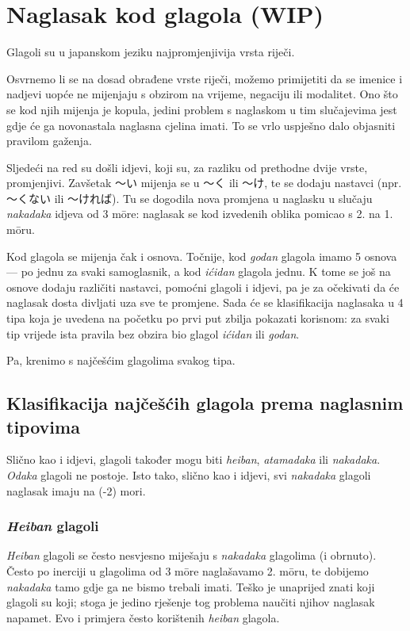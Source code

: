 \documentclass[12pt]{extarticle}
\begin{document}
	\section{Naglasak kod glagola (WIP)}
	\label{sec:glagoli}
	Glagoli su u japanskom jeziku najpromjenjivija vrsta riječi.
	
	Osvrnemo li se na dosad obrađene vrste riječi, možemo primijetiti da se imenice i nadjevi uopće ne mijenjaju s obzirom na vrijeme, negaciju ili modalitet.
	Ono što se kod njih mijenja je kopula, jedini problem s naglaskom u tim slučajevima jest gdje će ga novonastala naglasna cjelina imati.
	To se vrlo uspješno dalo objasniti pravilom gaženja.
	
	Sljedeći na red su došli idjevi, koji su, za razliku od prethodne dvije vrste, promjenjivi.
	Zavšetak 〜い mijenja se u 〜く ili 〜け, te se dodaju nastavci (npr. 〜くない ili 〜ければ).
	Tu se dogodila nova promjena u naglasku u slučaju \textit{nakadaka} idjeva od 3 m\=ore: naglasak se kod izvedenih oblika pomicao s 2. na 1. m\=oru.
	
	Kod glagola se mijenja čak i osnova.
	Točnije, kod \textit{godan} glagola imamo 5 osnova --- po jednu za svaki samoglasnik, a kod \textit{ićidan} glagola jednu.
	K tome se još na osnove dodaju različiti nastavci, pomoćni glagoli i idjevi, pa je za očekivati da će naglasak dosta divljati uza sve te promjene.
	Sada će se klasifikacija naglasaka u 4 tipa koja je uvedena na početku po prvi put zbilja pokazati korisnom: za svaki tip vrijede ista pravila bez obzira bio glagol \textit{ićidan} ili \textit{godan}.
	
	Pa, krenimo s najčešćim glagolima svakog tipa.
	
	\subsection{Klasifikacija najčešćih glagola prema naglasnim tipovima}
	Slično kao i idjevi, glagoli također mogu biti \textit{heiban}, \textit{atamadaka} ili \textit{nakadaka}.
	\textit{Odaka} glagoli ne postoje.
	Isto tako, slično kao i idjevi, svi \textit{nakadaka} glagoli naglasak imaju na (-2) mori.
	
	\subsubsection*{\textit{Heiban} glagoli}
	\textit{Heiban} glagoli se često nesvjesno miješaju s \textit{nakadaka} glagolima (i obrnuto).
	Često po inerciji u glagolima od 3 m\=ore naglašavamo 2. m\=oru, te dobijemo \textit{nakadaka} tamo gdje ga ne bismo trebali imati.
	Teško je unaprijed znati koji glagoli su koji; stoga je jedino rješenje tog problema naučiti njihov naglasak napamet.
	Evo i primjera često korištenih \textit{heiban} glagola.
	
\end{document}
